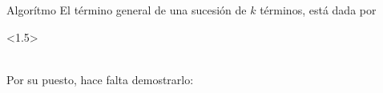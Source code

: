 \begin{proofbox}[10]{Algorítmo}
    El término general de una sucesión de $k$ términos, está dada por
    \begin{center}
        \begin{derivation}<1.5>
                \\
            \\
        \end{derivation}
    \end{center}
    Por su puesto, hace falta demostrarlo:
\end{proofbox}
\clearpage
